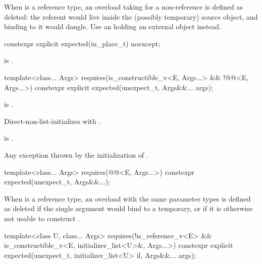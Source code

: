 \begin{itemdescr}
\pnum
\remarks
When  is a reference type, an overload taking  for a non-reference  is defined as deleted: the referent would live inside the (possibly temporary) source  object, and binding  to it would dangle. Use an  holding an external object instead.
\end{itemdescr}

%
\begin{itemdecl}
constexpr explicit expected(in_place_t) noexcept;
\end{itemdecl}

\begin{itemdescr}
\pnum
\ensures
{} is .
\end{itemdescr}

%
\begin{itemdecl}
template<class... Args>
  requires(is_constructible_v<E, Args...> && !@@<E, Args...>)
constexpr explicit expected(unexpect_t, Args&&... args);
\end{itemdecl}

\begin{itemdescr}
\pnum
\constraints
{} is .

\pnum
\effects
Direct-non-list-initializes  with .

\pnum
\ensures
{} is .

\pnum
\throws
Any exception thrown by the initialization of .
\end{itemdescr}

%
\begin{itemdecl}
template<class... Args>
  requires(@@<E, Args...>)
constexpr expected(unexpect_t, Args&&...);
\end{itemdecl}

\begin{itemdescr}
\pnum
\remarks
When  is a reference type, an overload with the same parameter types is defined as deleted if the single argument would bind  to a temporary, or if it is otherwise not usable to construct .
\end{itemdescr}

%
\begin{itemdecl}
template<class U, class... Args>
  requires(!is_reference_v<E> && is_constructible_v<E, initializer_list<U>&, Args...>)
constexpr explicit expected(unexpect_t, initializer_list<U> il, Args&&... args);
\end{itemdecl}

